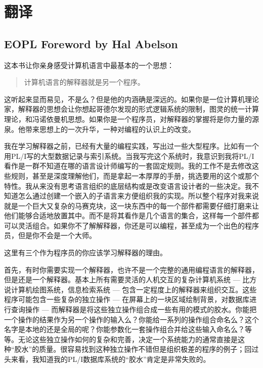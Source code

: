 
\chapter*{翻译}

\section*{EOPL\cite{friedman2001eopl} Foreword by Hal Abelson}

这本书让你亲身感受计算机语言中最基本的一个思想：

\begin{quotation}
计算机语言的解释器就是另一个程序。
\end{quotation}

这听起来显而易见，不是么？但是他的内涵确是深远的。如果你是一位计算机理论家，解释器的思想会让你想起哥德尔发现的形式逻辑系统的限制，图灵的统一计算理论，和冯诺依曼机思想。如果你是一个程序员，对解释器的掌握将是你力量的源泉。他带来思想上的一次升华，一种对编程的认识上的改变。

我在学习解释器之前，已经有大量的编程实践，写出过一些大型程序。比如有一个用PL/I写的大型数据记录与索引系统。当我写完这个系统时，我意识到我将PL/I看作是一群不知道在哪的语言设计师编写的一套固定规则。我的工作不是去修改这些规则，甚至是深度理解他们，而是拿起一本厚厚的手册，挑选要用的这个或那个特性。我从来没有思考语言组织的底层结构或是改变语言设计者的一些决定。我不知道怎么通过创建一个嵌入的子语言来方便组织我的实现。所以整个程序对我来说就是一个巨大又复杂的马赛克块，这一块东西中的每一个部件都需要仔细打磨来让他们能够合适地放置其中。而不是将其看作是几个语言的集合，这样每一个部件都可以灵活组合。如果你不了解解释器，你还是可以编程，甚至成为一个出色的程序员，但是你不会是一个大师。

这里有三个作为程序员的你应该学习解释器的理由。

首先，有时你需要实现一个解释器，也许不是一个完整的通用编程语言的解释器，但是还是一个解释器。基本上所有需要灵活的人机交互的复杂计算机系统 --- 比方说计算机绘图系统，信息检索系统 --- 包含一定程度上的解释器来组织交互。这些程序可能包含一些复杂的独立操作 --- 在屏幕上的一块区域绘制背景，对数据库进行查询操作 --- 而解释器是将这些独立操作组合成一些有用的模式的胶水。你能把一个操作的结果作为另一个操作的输入么？你能给一系列的操作组合命名么？这个名字是本地的还是全局的呢？你能参数化一套操作组合并给这些输入命名么？等等。无论这些独立操作如何的复杂和完善，决定一个系统能力的通常直接是这种``胶水''的质量。很容易找到这种独立操作不错但是组织极差的程序的例子；回过头来看，我知道我的PL/I数据库系统的``胶水''肯定是非常失败的。


